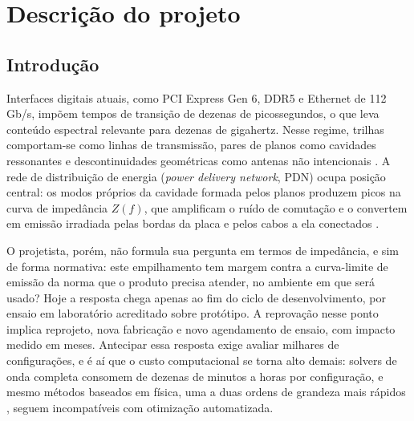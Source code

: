 %

\chapter{Descrição do projeto}
\label{cap:descricao}

\section{Introdução}
\label{sec:introducao}

Interfaces digitais atuais, como PCI Express Gen 6, DDR5 e Ethernet de 112\,Gb/s,
impõem tempos de transição de dezenas de picossegundos, o que leva conteúdo
espectral relevante para dezenas de gigahertz. Nesse regime, trilhas comportam-se
como linhas de transmissão, pares de planos como cavidades ressonantes e
descontinuidades geométricas como antenas não intencionais
\citep{johnson1993,ott2009}. A rede de distribuição de energia (\textit{power
delivery network}, PDN) ocupa posição central: os modos próprios da cavidade
formada pelos planos produzem picos na curva de impedância $Z(f)$, que amplificam o
ruído de comutação e o convertem em emissão irradiada pelas bordas da placa e pelos
cabos a ela conectados \citep{bogatin2010}.

O projetista, porém, não formula sua pergunta em termos de impedância, e sim de
forma normativa: este empilhamento tem margem contra a curva-limite de emissão da
norma que o produto precisa atender, no ambiente em que será usado? Hoje a resposta
chega apenas ao fim do ciclo de desenvolvimento, por ensaio em laboratório
acreditado sobre protótipo. A reprovação nesse ponto implica reprojeto, nova
fabricação e novo agendamento de ensaio, com impacto medido em meses. Antecipar
essa resposta exige avaliar milhares de configurações, e é aí que o custo
computacional se torna alto demais: solvers de onda completa consomem de dezenas de
minutos a horas por configuração, e mesmo métodos baseados em física, uma a duas
ordens de grandeza mais rápidos \citep{schierholz2021,hillebrecht2024}, seguem
incompatíveis com otimização automatizada.

